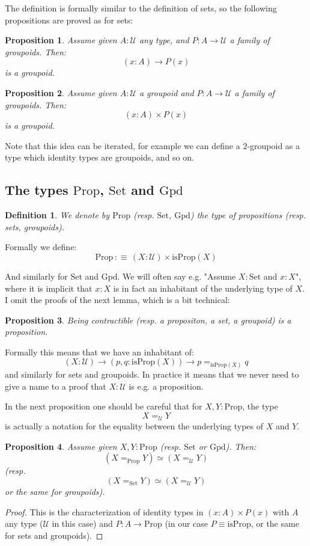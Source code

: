 \documentclass{article}
\newcommand{\sse}[1]{\medbreak \subsection{#1}}
\newcommand{\U}{{\mathcal U}}
\renewcommand{\r}{\rightarrow}
\newcommand{\Set}{\mathrm{Set}}
\newcommand{\Prop}{\mathrm{Prop}}
\newcommand{\Gpd}{\mathrm{Gpd}}
\newtheorem{definition}{Definition}
\newtheorem{proposition}{Proposition}
\begin{document}
The definition is formally similar to the definition of sets, so the following propositions are proved as for sets:

\begin{proposition}
Assume given $A:\U$ any type, and $P:A\r \U$ a family of groupoids. Then:
\[(x:A)\r P(x)\]
is a groupoid.
\end{proposition}

\begin{proposition}
Assume given $A:\U$ a groupoid and $P:A\r \U$ a family of groupoids. Then:
\[(x:A)\times P(x)\]
is a groupoid.
\end{proposition}

 Note that this idea can be iterated, for example we can define a $2$-groupoid as a type which identity types are groupoids, and so on.




\sse{The types $\Prop$, $\Set$ and $\Gpd$}

\begin{definition}
We denote by $\Prop$ (resp. $\Set$, $\Gpd$) the type of propositions (resp. sets, groupoids).%
\end{definition}

Formally we define:
\[\Prop \, :\equiv\, (X:\U)\times \mathrm{isProp}(X)\]

And similarly for $\Set$ and $\Gpd$. We will often say e.g. "Assume $X:\Set$ and $x:X$", where it is implicit that $x:X$ is in fact an inhabitant of the underlying type of $X$. I omit the proofs of the next lemma, which is a bit technical:

\begin{proposition}
Being contractible (resp. a propositon, a set, a groupoid) is a proposition.
\end{proposition}

Formally this means that we have an inhabitant of:
\[(X:\U)\r (p,q:\mathrm{isProp}(X)) \r p=_{\mathrm{isProp}(X)} q\] 
and similarly for sets and groupoids. In practice it means that we never need to give a name to a proof that $X:\U$ is e.g. a proposition.

In the next proposition one should be careful that for $X,Y:\Prop$, the type 
\[X=_\U Y\] 
is actually a notation for the equality between the underlying types of $X$ and $Y$.%

\begin{proposition}
Assume given $X,Y:\Prop$ (resp. $\Set$ or $\Gpd$). Then:
\[(X=_\Prop Y) \simeq (X=_\U Y)\]
(resp. 
\[(X=_\Set Y) \simeq (X=_\U Y)\]
or the same for groupoids).
\end{proposition}
\begin{proof}
This is the characterization of identity types in $(x:A)\times P(x)$ with $A$ any type ($\U$ in this case) and $P:A\r \Prop$ (in our case $P\equiv\mathrm{isProp}$, or the same for sets and groupoids). %
\end{proof}
\end{document}
